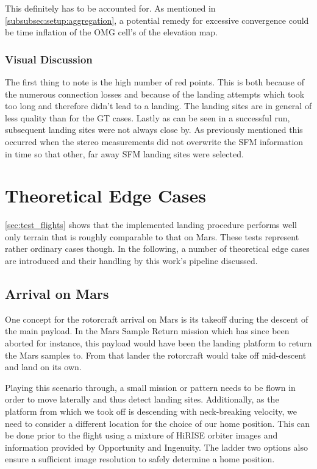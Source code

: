     This definitely has to be accounted for. As mentioned in \cref{subsubsec:setup:aggregation}, a potential remedy for excessive convergence could be time inflation of the OMG cell's of the elevation map.
    
    \subsubsection{Visual Discussion}
    The first thing to note is the high number of red points. This is both because of the numerous connection losses and because of the landing attempts which took too long and therefore didn't lead to a landing. The landing sites are in general of less quality than for the GT cases. Lastly as can be seen in a successful run, subsequent landing sites were not always close by. As previously mentioned this occurred when the stereo measurements did not overwrite the SFM information in time so that other, far away SFM landing sites were selected.

\section{Theoretical Edge Cases}
\cref{sec:test_flights} shows that the implemented landing procedure performs well only terrain that is roughly comparable to that on Mars. These tests represent rather ordinary cases though. In the following, a number of theoretical edge cases are introduced and their handling by this work's pipeline discussed.

\subsection{Arrival on Mars}
One concept for the rotorcraft arrival on Mars is its takeoff during the descent of the main payload. In the Mars Sample Return mission which has since been aborted for instance, this payload would have been the landing platform to return the Mars samples to. From that lander the rotorcraft would take off mid-descent and land on its own.

Playing this scenario through, a small mission or pattern needs to be flown in order to move laterally and thus detect landing sites. Additionally, as the platform from which we took off is descending with neck-breaking velocity, we need to consider a different location for the choice of our home position. This can be done prior to the flight using a mixture of HiRISE orbiter images and information provided by Opportunity and Ingenuity. The ladder two options also ensure a sufficient image resolution to safely determine a home position.


